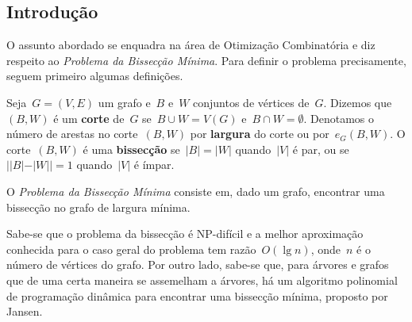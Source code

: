 \documentclass[a0,portrait]{a0poster}
\begin{document}
\begin{multicols}{3} %


\color{Navy} %


\color{Black} %
\section*{Introdução}
O assunto abordado se
enquadra na área de Otimização Combinatória e diz respeito ao 
\emph{Problema da Bissecção Mínima}. Para definir o problema 
precisamente, seguem primeiro algumas definições. 

Seja~${G=(V,E)}$ um grafo e~$B$ e~$W$ conjuntos de vértices de~$G$.
Dizemos que~$(B,W)$ é um \textbf{corte}
de~$G$ se~${B \cup W =V(G)}$ e~${B\cap W =\emptyset}$.
Denotamos o número de arestas no corte~$(B,W)$ por \textbf{largura}
do corte ou por~$e_G(B,W)$.
O corte~$(B,W)$ é uma \textbf{bissecção} se~${|B| =|W|}$
quando~$|V|$ é par, ou se~${||B|-|W|| =1}$ quando~$|V|$ é ímpar.

O \emph{Problema da Bissecção Mínima} consiste em, dado um grafo, 
encontrar uma bissecção no grafo de largura mínima.

Sabe-se que o problema da bissecção é NP-difícil
e a melhor aproximação conhecida para o caso geral do problema tem 
razão~$O(\lg n)$, onde~$n$ é o número de vértices 
do grafo. 
Por outro lado, sabe-se que, para árvores e grafos que de uma 
certa maneira se assemelham a árvores, há um algoritmo polinomial 
de programação dinâmica para encontrar uma bissecção mínima, 
proposto por Jansen. 


\end{multicols}
\end{document}
